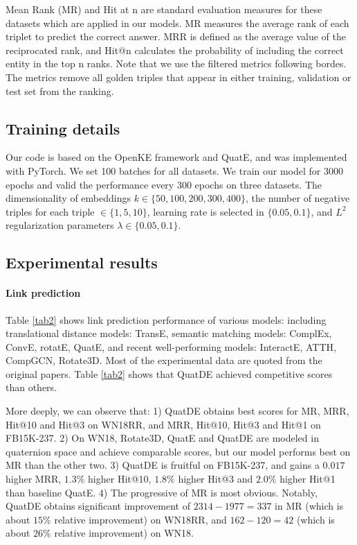\documentclass[letterpaper]{article} \usepackage{aaai20}  \usepackage{times}  \usepackage{helvet} \usepackage{courier}  \usepackage[hyphens]{url}  \usepackage{graphicx} \usepackage{lineno,hyperref,amsmath,amssymb}
\begin{document}
Mean Rank (MR) and Hit at n are standard evaluation measures for these datasets which are applied in our models. MR measures the average rank of each triplet to predict the correct answer. MRR is defined as the average value of the reciprocated rank, and Hit@n calculates the probability of including the correct entity in the top n ranks. Note that we use the filtered metrics following bordes\cite{bordes2013translating}. The metrics remove all golden triples that appear in either training, validation or test set from the ranking.

\subsection{Training details}

Our code is based on the OpenKE framework and QuatE, and was implemented with PyTorch. We set 100 batches for all datasets. We train our model for 3000 epochs and valid the performance every 300 epochs on three datasets. The dimensionality of embeddings $k \in \{50,100,200,300,400\}$, the number of negative triples for each triple $ \in \{1,5,10\}$, learning rate is selected in $\{0.05,0.1\}$, and $L^2$ regularization parameters $\lambda \in \{0.05,0.1\}$. 

\subsection{Experimental results}

\paragraph{\textbf{Link prediction}}Table \ref{tab2} shows link prediction performance of various models: including translational distance models: TransE\cite{bordes2013translating}, semantic matching models: ComplEx\cite{trouillon2016complex}, ConvE\cite{dettmers2018convolutional}, rotatE\cite{sun2019rotate}, QuatE\cite{zhang2019quaternion}, and recent well-performing models: InteractE\cite{vashishth2020interacte}, ATTH\cite{chami2020low}, CompGCN\cite{vashishth2019composition}, Rotate3D\cite{gao2020rotate3d}. Most of the experimental data are quoted from the original papers. Table \ref{tab2} shows that QuatDE achieved competitive scores than others.

More deeply, we can observe that: 1) QuatDE obtains best scores for MR, MRR, Hit@10 and Hit@3 on WN18RR, and MRR, Hit@10, Hit@3 and Hit@1 on FB15K-237. 2) On WN18, Rotate3D, QuatE and QuatDE are modeled in quaternion space and achieve comparable scores, but our model performs best on MR than the other two. 3) QuatDE is fruitful on FB15K-237, and gains a $0.017$ higher MRR, $1.3\%$ higher Hit@10, $1.8\%$ higher Hit@3 and $2.0\%$ higher Hit@1 than baseline QuatE. 4) The progressive of MR is most obvious. Notably, QuatDE obtains significant improvement of $2314-1977=337$ in MR (which is about $15\%$ relative improvement) on WN18RR, and $162-120=42$ (which is about $26\%$ relative improvement) on WN18.
\end{document}
